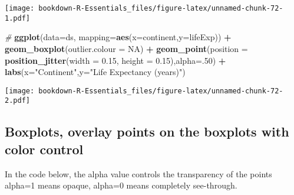 \documentclass[]{book}
\newenvironment{Shaded}{\begin{snugshade}}{\end{snugshade}}
\newcommand{\KeywordTok}[1]{\textcolor[rgb]{0.13,0.29,0.53}{\textbf{#1}}}
\newcommand{\DataTypeTok}[1]{\textcolor[rgb]{0.13,0.29,0.53}{#1}}
\newcommand{\DecValTok}[1]{\textcolor[rgb]{0.00,0.00,0.81}{#1}}
\newcommand{\FloatTok}[1]{\textcolor[rgb]{0.00,0.00,0.81}{#1}}
\newcommand{\StringTok}[1]{\textcolor[rgb]{0.31,0.60,0.02}{#1}}
\newcommand{\CommentTok}[1]{\textcolor[rgb]{0.56,0.35,0.01}{\textit{#1}}}
\newcommand{\OtherTok}[1]{\textcolor[rgb]{0.56,0.35,0.01}{#1}}
\newcommand{\OperatorTok}[1]{\textcolor[rgb]{0.81,0.36,0.00}{\textbf{#1}}}
\newcommand{\NormalTok}[1]{#1}
\begin{document}
\texttt{[image: bookdown-R-Essentials\_files/figure-latex/unnamed-chunk-72-1.pdf]}

\begin{Shaded}
\begin{Highlighting}[]
\CommentTok{#}
\KeywordTok{ggplot}\NormalTok{(}\DataTypeTok{data=}\NormalTok{ds, }\DataTypeTok{mapping=}\KeywordTok{aes}\NormalTok{(}\DataTypeTok{x=}\NormalTok{continent,}\DataTypeTok{y=}\NormalTok{lifeExp)) }\OperatorTok{+}\StringTok{  }
\StringTok{ }\KeywordTok{geom_boxplot}\NormalTok{(}\DataTypeTok{outlier.colour =} \OtherTok{NA}\NormalTok{) }\OperatorTok{+}\StringTok{ }
\StringTok{ }\KeywordTok{geom_point}\NormalTok{(}\DataTypeTok{position =} \KeywordTok{position_jitter}\NormalTok{(}\DataTypeTok{width =} \FloatTok{0.15}\NormalTok{, }\DataTypeTok{height =} \FloatTok{0.15}\NormalTok{),}\DataTypeTok{alpha=}\NormalTok{.}\DecValTok{50}\NormalTok{) }\OperatorTok{+}
\StringTok{  }\KeywordTok{labs}\NormalTok{(}\DataTypeTok{x=}\StringTok{"Continent"}\NormalTok{,}\DataTypeTok{y=}\StringTok{"Life Expectancy (years)"}\NormalTok{)}
\end{Highlighting}
\end{Shaded}

\texttt{[image: bookdown-R-Essentials\_files/figure-latex/unnamed-chunk-72-2.pdf]}

\subsection{Boxplots, overlay points on the boxplots with color
control}\label{boxplots-overlay-points-on-the-boxplots-with-color-control}

In the code below, the alpha value controls the transparency of the
points alpha=1 means opaque, alpha=0 means completely see-through.
\end{document}
